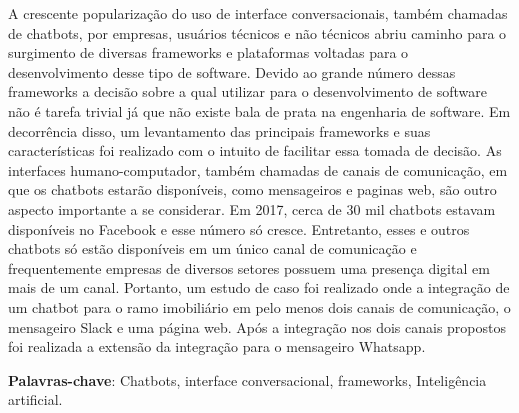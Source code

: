\setlength{\absparsep}{18pt} %
\begin{resumo}
 A crescente popularização do uso de interface conversacionais, também chamadas de chatbots, por empresas, usuários técnicos e não técnicos abriu caminho para o surgimento de diversas frameworks e plataformas voltadas para o desenvolvimento desse tipo de software. Devido ao grande número dessas frameworks a decisão sobre a qual utilizar para o desenvolvimento de software não é tarefa trivial já que não existe bala de prata na engenharia de software. Em decorrência disso, um levantamento das principais frameworks e suas características foi realizado com o intuito de facilitar essa tomada de decisão. As interfaces humano-computador, também chamadas de canais de comunicação, em que os chatbots estarão disponíveis, como mensageiros e paginas web, são outro aspecto importante a se considerar. Em 2017, cerca de 30 mil chatbots estavam disponíveis no Facebook e esse número só cresce. Entretanto, esses e outros chatbots só estão disponíveis em um único canal de comunicação e frequentemente empresas de diversos setores possuem uma presença digital em mais de um canal. Portanto, um estudo de caso foi realizado onde a integração de um chatbot para o ramo imobiliário em pelo menos dois canais de comunicação, o mensageiro Slack e uma página web. Após a integração nos dois canais propostos foi realizada a extensão da integração para o mensageiro Whatsapp. 

 \textbf{Palavras-chave}: Chatbots, interface conversacional, frameworks, Inteligência artificial.
\end{resumo}
